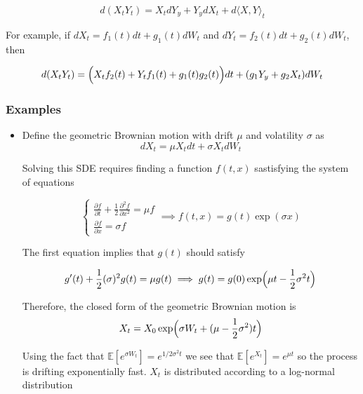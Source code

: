 \documentclass[11pt,a4paper]{article}
\begin{document}
\begin{equation}
    d(X_tY_t) = X_tdY_y+Y_ydX_t + d\langle X, Y\rangle_t
\end{equation}


For example, if $dX_t = f_1(t)dt + g_1(t)dW_t$ and $dY_t = f_2(t)dt + g_2(t)dW_t$, then 

\begin{equation}
    d(X_tY_t) = \Bigl(X_tf_2(t)+Y_t f_1(t)+ g_1(t) g_2(t)\Bigl)dt + (g_1Y_y+g_2X_t)dW_t
\end{equation}


\subsubsection{Examples}
\begin{itemize}

    \item Define the geometric Brownian motion with drift $\mu$ and volatility $\sigma$ as
    \begin{equation}
        dX_t = \mu X_t dt + \sigma X_t dW_t 
    \end{equation}

    Solving this SDE requires finding a function $f(t,x)$ sastisfying the system of equations 

    \begin{equation}
        \begin{cases}
            \frac{\partial f}{\partial t} + \frac{1}{2}\frac{\partial^2 f}{\partial x^2} = \mu f \\
        \frac{\partial f}{\partial x}  = \sigma f      
        \end{cases} \implies f(t,x) = g(t)\exp(\sigma x)
    \end{equation}

The first equation implies that $g(t)$ should satisfy

\begin{equation}
    g'(t) + \frac{1}{2}(\sigma)^2g(t) = \mu g(t) \implies g(t) = g(0) \exp\Bigl(\mu t-\frac{1}{2}\sigma^2 t\Bigl)
\end{equation}

Therefore, the closed form of the geometric Brownian motion is
\begin{equation}
    X_t = X_0 \exp\Bigl(\sigma W_t+(\mu-\frac{1}{2}\sigma^2) t\Bigl)
\end{equation}

Using the fact that $\mathbb{E}[e^{\sigma W_t}] = e^{1/2\sigma^2 t}$ we see that $\mathbb{E}[e^{X_t}] = e^{\mu t}$ so the process is drifting exponentially fast. $X_t$ is distributed according to a log-normal distribution


\end{itemize}
\end{document}
